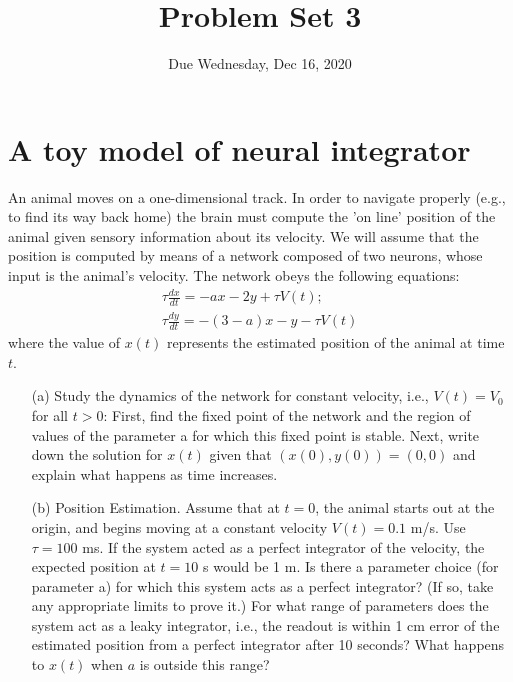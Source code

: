 \documentclass{article}
\title{Problem Set 3}
\date{Due Wednesday, Dec 16, 2020}
\begin{document}
\maketitle

\section*{A toy model of neural integrator}
An animal moves on a one-dimensional track. In order to navigate properly (e.g., to find its way back home) the brain must compute the 'on line' position of the animal given sensory information about its velocity. We will assume that the position is computed by means of a network composed of two neurons, whose input is the animal's velocity. The network obeys the following equations:
\begin{equation}
\begin{aligned}
\tau \frac{dx}{dt}=-ax-2y+\tau V(t); \\
\tau \frac{dy}{dt}=-(3-a)x-y-\tau V(t)
\end{aligned}
\end{equation}
where the value of $x(t)$ represents the estimated position of the animal at time $t$. 

\begin{enumerate}
\item[(a)] Study the dynamics of the network for constant velocity, i.e., $V(t)=V_0$ for all $t>0$:
First, find the fixed point of the network and the region of values of the parameter a for which this fixed point is stable. Next, write down the solution for $x(t)$ given that $(x(0),y(0))=(0,0)$ and explain what happens as time increases.
\item[(b)] Position Estimation. Assume that at $t = 0$, the animal starts out at the origin, and begins moving at a constant velocity $V(t) = 0.1$ m/s. Use $\tau =100$ ms. If the system acted as a perfect integrator of the velocity, the expected position at $t=10$ s would be 1 m. Is there a parameter choice (for parameter a) for which this system acts as a perfect integrator? (If so, take any appropriate limits to prove it.) For what range of parameters does the system act as a leaky integrator, i.e., the readout is within 1 cm error of the estimated position from a perfect integrator after 10 seconds? What happens to $x(t)$ when $a$ is outside this range?
\end{enumerate}
\end{document}
